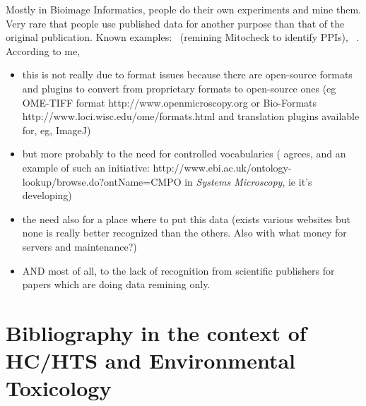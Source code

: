 \documentclass[12pt]{article}
\begin{document}
Mostly in Bioimage Informatics, people do their own experiments and mine them. Very rare that people use published data for another purpose than that of the original publication. Known examples:~\cite{pmid25255318} (remining Mitocheck to identify PPIs), ~\cite{pmid24131777}. According to me,
\begin{itemize}
\item this is not really due to format issues because there are open-source formats and plugins to convert from proprietary formats to open-source ones (eg OME-TIFF format http://www.openmicroscopy.org or Bio-Formats http://www.loci.wisc.edu/ome/formats.html and translation plugins available for, eg, ImageJ)
\item but more probably to the need for controlled vocabularies (\cite{pmid18603566} agrees, and an example of such an initiative: http://www.ebi.ac.uk/ontology-lookup/browse.do?ontName=CMPO in \textit{Systems Microscopy}, ie it's developing)
\item the need also for a place where to put this data (exists various websites but none is really better recognized than the others. Also with what money for servers and maintenance?)
\item AND most of all, to the lack of recognition from scientific publishers for papers which are doing data remining only.
\end{itemize}   

\section{Bibliography in the context of HC/HTS and Environmental Toxicology
}

\end{document}
